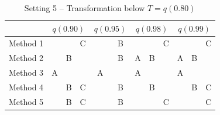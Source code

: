 \documentclass[11pt]{article}
\begin{document}
\begin{table}[htbp]
  \centering
  \caption{Setting 5 -- Transformation below $T = q(0.80)$}
  \label{tbl:transsim}
  \begin{tabular}{|l|ccc|cc|ccc|ccc|}
    \cline{2-12}
    \multicolumn{1}{c}{} & \multicolumn{3}{|c}{$q(0.90)$} & \multicolumn{2}{|c}{$q(0.95)$} & \multicolumn{3}{|c}{$q(0.98)$} & \multicolumn{3}{|c|}{$q(0.99)$} \\
    \hline
    Method 1 &   &   & C &   & B &   &   & C &   &   & C \\
    \hline
    Method 2 &   & B &   &   & B & A & B &   & A & B &   \\
    \hline
    Method 3 & A &   &   & A &   & A &   &   & A &   &   \\
    \hline
    Method 4 &   & B & C &   & B &   & B &   &   & B & C \\
    \hline
    Method 5 &   & B & C &   & B &   &   & C &   &   & C \\
    \hline
  \end{tabular}
\end{table}

\begin{singlespace}


\end{singlespace}
\end{document}
